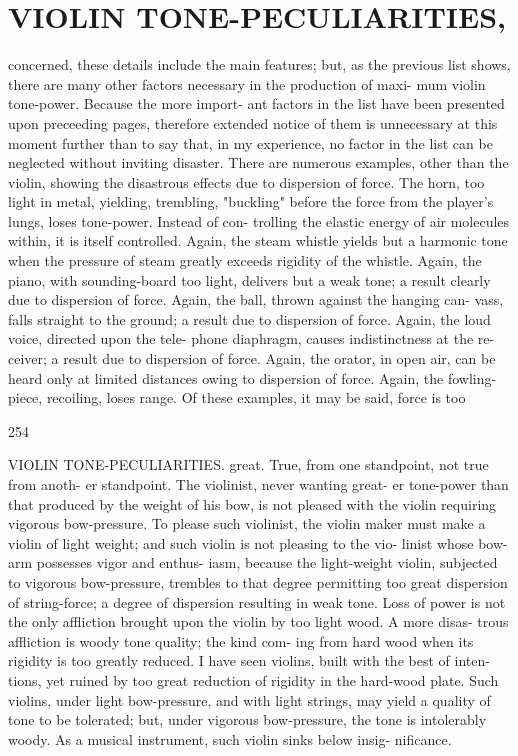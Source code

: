 \documentclass{article}
\begin{document}
\section*{VIOLIN TONE-PECULIARITIES,}
concerned, these details include the main features; but, as the previous list shows, there are many other factors necessary in the production of maxi- mum violin tone-power. Because the more import- ant factors in the list have been presented upon preceeding pages, therefore extended notice of them is unnecessary at this moment further than to say that, in my experience, no factor in the list can be neglected without inviting disaster. There are numerous examples, other than the violin, showing the disastrous effects due to dispersion of force. The horn, too light in metal, yielding, trembling, "buckling" before the force from the player's lungs, loses tone-power. Instead of con- trolling the elastic energy of air molecules within, it is itself controlled. Again, the steam whistle yields but a harmonic tone when the pressure of steam greatly exceeds rigidity of the whistle. Again, the piano, with sounding-board too light, delivers but a weak tone; a result clearly due to dispersion of force. Again, the ball, thrown against the hanging can- vass, falls straight to the ground; a result due to dispersion of force. Again, the loud voice, directed upon the tele- phone diaphragm, causes indistinctness at the re- ceiver; a result due to dispersion of force. Again, the orator, in open air, can be heard only at limited distances owing to dispersion of force. Again, the fowling-piece, recoiling, loses range. Of these examples, it may be said, force is too

254

VIOLIN TONE-PECULIARITIES. great. True, from one standpoint, not true from anoth- er standpoint. The violinist, never wanting great- er tone-power than that produced by the weight of his bow, is not pleased with the violin requiring vigorous bow-pressure. To please such violinist, the violin maker must make a violin of light weight; and such violin is not pleasing to the vio- linist whose bow-arm possesses vigor and enthus- iasm, because the light-weight violin, subjected to vigorous bow-pressure, trembles to that degree permitting too great dispersion of string-force; a degree of dispersion resulting in weak tone. Loss of power is not the only affliction brought upon the violin by too light wood. A more disas- trous affliction is woody tone quality; the kind com- ing from hard wood when its rigidity is too greatly reduced. I have seen violins, built with the best of inten- tions, yet ruined by too great reduction of rigidity in the hard-wood plate. Such violins, under light bow-pressure, and with light strings, may yield a quality of tone to be tolerated; but, under vigorous bow-pressure, the tone is intolerably woody. As a musical instrument, such violin sinks below insig- nificance.
\end{document}
